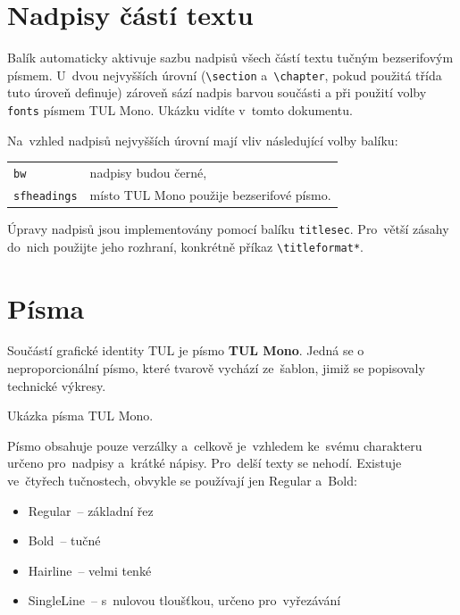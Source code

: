 \documentclass[a4paper,12pt,fonts,numbering,listingsleft]{./tulpackage/tularticle}
\newcommand{\cmdfont}[1]{\texttt{\color{\tulcolor}#1}}
\newcommand{\cmdnoindex}[1]{\cmdfont{\textbackslash{}#1}}
\begin{document}
\clearpage

\section{Nadpisy částí textu}

Balík automaticky aktivuje sazbu nadpisů všech částí textu tučným bezserifovým
písmem. U~dvou nejvyšších úrovní (\cmdnoindex{section} a~\cmdnoindex{chapter},
pokud použitá třída tuto úroveň definuje) zároveň sází nadpis barvou součásti a
při použití volby \cmdfont{fonts} písmem TUL Mono. Ukázku vidíte v~tomto
dokumentu.

Na~vzhled nadpisů nejvyšších úrovní mají vliv následující volby balíku:

\begin{tabularx}{\textwidth}{@{}lX}
    \cmdfont{bw}         & nadpisy budou černé,                      \\
    \cmdfont{sfheadings} & místo TUL Mono použije bezserifové písmo. \\
\end{tabularx}

Úpravy nadpisů jsou implementovány pomocí balíku \cmdfont{titlesec}. Pro~větší
zásahy do~nich použijte jeho rozhraní, konkrétně příkaz
\cmdnoindex{titleformat*}.

\clearpage

\section{Písma}\label{pisma}

Součástí grafické identity TUL je písmo \textbf{TUL Mono}. Jedná se o
neproporcionální písmo, které tvarově vychází ze~šablon, jimiž se
popisovaly technické výkresy.

\vspace{0.4\baselineskip}
{\TULFancyFont{}Ukázka písma TUL Mono.}
\vspace{0.1\baselineskip}

Písmo obsahuje pouze verzálky a~celkově je~vzhledem ke~svému charakteru určeno
pro~nadpisy a~krátké nápisy. Pro~delší texty se nehodí. Existuje ve~čtyřech
tučnostech, obvykle se používají jen Regular a~Bold:

\begin{itemize}\setlength{\itemsep}{0pt}
    \item Regular~-- základní řez
    \item Bold~-- tučné
    \item Hairline~-- velmi tenké
    \item SingleLine~-- s~nulovou tloušťkou, určeno pro~vyřezávání
\end{itemize}
\end{document}
